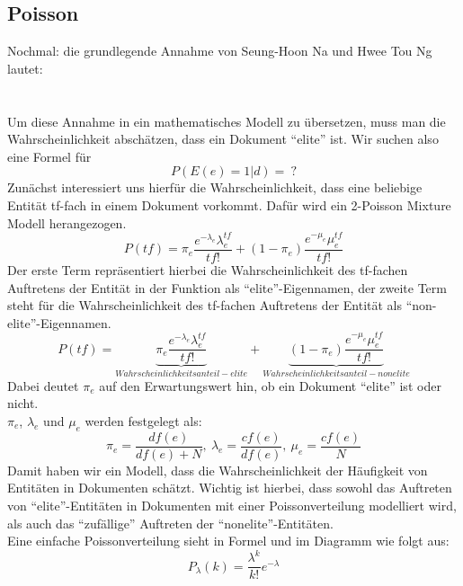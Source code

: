 \subsection{Poisson}
Nochmal: die grundlegende Annahme von Seung-Hoon Na und Hwee Tou Ng lautet:\\
\\
\\
Um diese Annahme in ein mathematisches Modell zu übersetzen, muss man die Wahrscheinlichkeit abschätzen, dass ein Dokument ``elite'' ist. Wir suchen also eine Formel für
\[P\left( E\left( e \right)=1|d \right)=\ ?\]
Zunächst interessiert uns hierfür die Wahrscheinlichkeit, dass eine beliebige Entität tf-fach in einem Dokument vorkommt. Dafür wird ein 2-Poisson Mixture Modell herangezogen.
\[P\left( tf \right)=\pi_e\frac{e^{-\lambda_e}\lambda_{e}^{ tf }}{tf!}+\left( 1-\pi_e \right)\frac{e^{-\mu_e} \mu_e^{tf}}{tf!}\]
Der erste Term repräsentiert hierbei die Wahrscheinlichkeit des tf-fachen Auftretens der Entität in der Funktion als ``elite''-Eigennamen, der zweite Term steht für die Wahrscheinlichkeit des tf-fachen Auftretens der Entität als ``non-elite''-Eigennamen.
\[P\left( tf \right)=\underbrace{\pi_e\frac{e^{-\lambda_e}\lambda_{e}^{ tf }}{tf!}}_{Wahrscheinlichkeitsanteil - elite} +\underbrace{\left( 1-\pi_e \right)\frac{e^{-\mu_e} \mu_e^{tf}}{tf!}}_{Wahrscheinlichkeitsanteil - nonelite}\]
Dabei deutet $\pi_e$ auf den Erwartungswert hin, ob ein Dokument ``elite'' ist oder nicht.\\
$\pi_e$, $\lambda_e$ und $\mu_e$ werden festgelegt als:
\[\pi_e=\frac{df\left( e \right)}{df\left( e \right)+N}, \ \lambda_e=\frac{cf\left( e \right)}{df\left( e \right)}, \ \mu_e=\frac{cf(e)}{N}\]
Damit haben wir ein Modell, dass die Wahrscheinlichkeit der Häufigkeit von Entitäten in Dokumenten schätzt. Wichtig ist hierbei, dass sowohl das Auftreten von ``elite''-Entitäten in Dokumenten mit einer Poissonverteilung modelliert wird, als auch das ``zufällige'' Auftreten der ``nonelite''-Entitäten.\\
Eine einfache Poissonverteilung sieht in Formel und im Diagramm wie folgt aus:
\[P_\lambda(k)=\frac{\lambda^k}{k!}e^{-\lambda}\]
